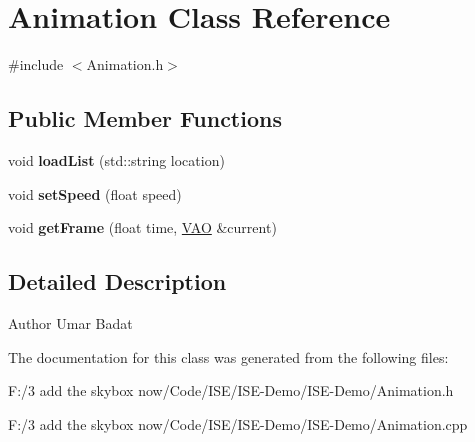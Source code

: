 \hypertarget{class_animation}{\section{Animation Class Reference}
\label{class_animation}
}


{\ttfamily \#include $<$Animation.\-h$>$}

\subsection*{Public Member Functions}
\begin{DoxyCompactItemize}
\item 
\hypertarget{class_animation_a3967cc5cf8ada2634e5cc36cd8f0efbb}{void {\bfseries load\-List} (std\-::string location)}\label{class_animation_a3967cc5cf8ada2634e5cc36cd8f0efbb}

\item 
\hypertarget{class_animation_abc5071d1c6466d355c7a80a31fdb1f0a}{void {\bfseries set\-Speed} (float speed)}\label{class_animation_abc5071d1c6466d355c7a80a31fdb1f0a}

\item 
\hypertarget{class_animation_a7a7535c6d3bb9bbfb057521421cadd2b}{void {\bfseries get\-Frame} (float time, \hyperlink{class_v_a_o}{V\-A\-O} \&current)}\label{class_animation_a7a7535c6d3bb9bbfb057521421cadd2b}

\end{DoxyCompactItemize}


\subsection{Detailed Description}
\begin{DoxyAuthor}{Author}
Umar Badat 
\end{DoxyAuthor}


The documentation for this class was generated from the following files\-:\begin{DoxyCompactItemize}
\item 
F\-:/3 add the skybox now/\-Code/\-I\-S\-E/\-I\-S\-E-\/\-Demo/\-I\-S\-E-\/\-Demo/Animation.\-h\item 
F\-:/3 add the skybox now/\-Code/\-I\-S\-E/\-I\-S\-E-\/\-Demo/\-I\-S\-E-\/\-Demo/Animation.\-cpp\end{DoxyCompactItemize}
